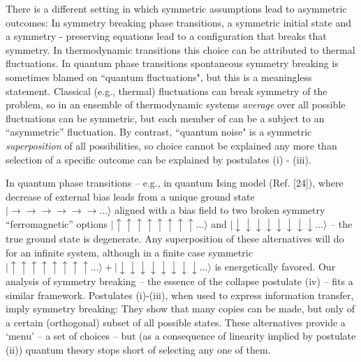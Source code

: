 \documentclass[aps,twocolumn,pra]{revtex4}
\newcommand{\ket}[1]    {| #1 \rangle}
\newcommand{\+}         {\dagger}
\begin{document}
There is a different setting in which symmetric assumptions lead to asymmetric outcomes: 
In symmetry breaking phase transitions, a symmetric initial state and a symmetry 
- preserving equations lead to a configuration that breaks that symmetry.  In 
thermodynamic transitions this choice can be attributed to thermal fluctuations. In quantum phase transitions spontaneous symmetry breaking is sometimes blamed on 
``quantum fluctuations", but this is a meaningless statement. Classical (e.g., thermal) fluctuations 
can break symmetry of the problem, so in an ensemble of thermodynamic systems {\it average} over 
all possible fluctuations can be symmetric, but each member of can be a subject to an ``asymmetric'' fluctuation. By contrast,  ``quantum noise" is a symmetric {\it superposition} of all possibilities, 
so choice cannot be explained any more than  selection of a specific 
outcome can be explained by postulates (i) - (iii). 

In quantum phase transitions -- e.g., in quantum Ising model (Ref. [24]), where decrease of external 
bias leads from a unique ground state $\ket {\rightarrow \rightarrow \rightarrow \rightarrow \rightarrow \rightarrow \dots}$ aligned with a bias field to two broken symmetry  ``ferromagnetic'' options 
$\ket{\uparrow \uparrow \uparrow \uparrow \uparrow \uparrow \uparrow \uparrow \dots}$ and $\ket{\downarrow \downarrow \downarrow \downarrow\downarrow \downarrow\downarrow \downarrow \dots} $ -- the true ground state is degenerate. Any superposition of these alternatives will do for an
infinite system, although in a finite case symmetric $\ket{\uparrow \uparrow \uparrow \uparrow \uparrow \uparrow \uparrow \uparrow \dots} + \ket {\downarrow \downarrow \downarrow \downarrow\downarrow \downarrow\downarrow \downarrow \dots} $ is energetically favored.
Our analysis of symmetry breaking -- the essence of the collapse postulate (iv) -- fits a similar 
framework. Postulates (i)-(iii), when used to express information transfer, imply symmetry breaking: 
They show that many copies can be made, but only of a certain (orthogonal) subset of all possible 
states. These alternatives provide a `menu' -- a set of choices -- but (as a consequence 
of linearity implied by postulate (ii)) quantum theory stops short of selecting any one of them.
\end{document}

